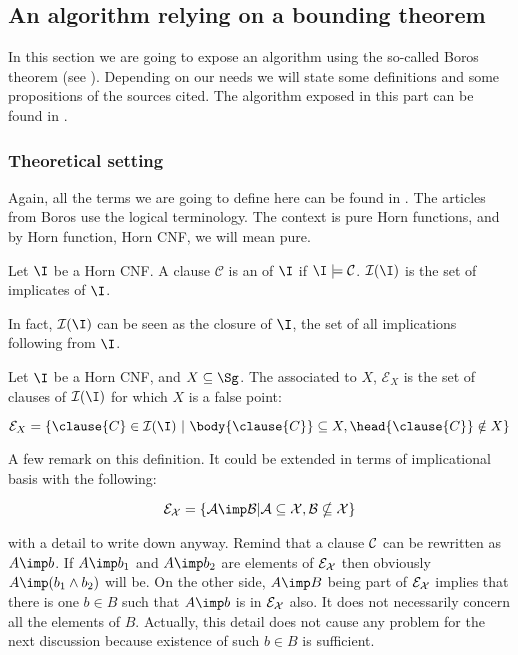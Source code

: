 \subsection{An algorithm relying on a bounding theorem}

In this section we are going to expose an algorithm using the so-called Boros
theorem (see \cite{berczi_directed_2017, boros_strong_2017, 
boros_exclusive_2010}). Depending on our needs we will state some definitions 
and some propositions of the sources cited. The algorithm exposed in this part
can be found in \cite{berczi_directed_2017}.

\subsubsection{Theoretical setting}

Again, all the terms we are going to define here can be found in 
\cite{berczi_directed_2017, boros_strong_2017, boros_exclusive_2010}. The 
articles from Boros use the logical terminology. The context is pure Horn 
functions, and by Horn function, Horn CNF, we will mean pure.

\begin{definition} Let $\I$ be a Horn CNF. A clause 
$\mathcal{C}$ is an  of $\I$ if $\I \models \mathcal{C}$.
$\mathcal{I}(\I)$ is the set of implicates of $\I$.
\end{definition}

In fact, $\mathcal{I}(\I)$ can be seen as the closure of $\I$, the set of all
implications following from $\I$.

\begin{definition} Let $\I$ be a Horn CNF, and $X 
\subseteq \Sg$. The  associated to $X$, $\mathcal{E}_X$
is the set of clauses of $\mathcal{I}(\I)$ for which $X$ is a false point:

	\[ \mathcal{E}_X = \{ \clause{C} \in \mathcal{I}(\I) \ | 
		\ \body{\clause{C}} \subseteq X, \head{\clause{C}} \notin X \} \] 
\end{definition}

A few remark on this definition. It could be extended in terms of implicational
basis with the following:

	\[ \cal{E}_X = \{ A \imp B | A \subseteq X, B \nsubseteq X \} \]

\noindent with a detail to write down anyway. Remind that a clause $\cal{C}$ 
can be rewritten as $A \imp b$. If $A \imp b_1$ and $A \imp b_2$ are elements 
of $\cal{E}_X$ then obviously $A \imp (b_1 \land b_2)$ will be. On the other 
side, $A \imp B$ being part of $\cal{E}_X$ implies that there is  one $b \in B$ such that $A \imp b$ is in $\cal{E}_X$ also. It does not 
necessarily concern all the elements of $B$. Actually, this detail does not 
cause any problem for the next discussion because existence of such $b \in B$ 
is sufficient. 

